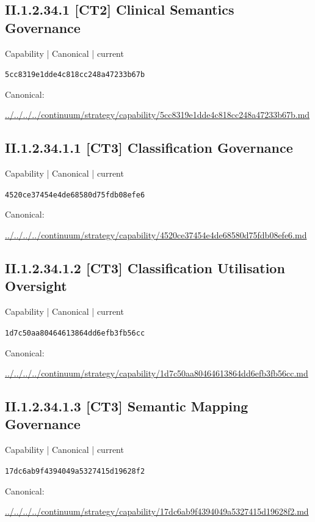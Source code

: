 \documentclass[10pt,a4paper]{article}
\begin{document}
\subsection*{II.1.2.34.1 [CT2] Clinical Semantics Governance}
{\small Capability | Canonical | current}\par
\texttt{5cc8319e1dde4c818cc248a47233b67b}\par
Canonical: \par
{\footnotesize\url{../../../../continuum/strategy/capability/5cc8319e1dde4c818cc248a47233b67b.md}}\par
\subsection*{II.1.2.34.1.1 [CT3] Classification Governance}
{\small Capability | Canonical | current}\par
\texttt{4520ce37454e4de68580d75fdb08efe6}\par
Canonical: \par
{\footnotesize\url{../../../../continuum/strategy/capability/4520ce37454e4de68580d75fdb08efe6.md}}\par
\subsection*{II.1.2.34.1.2 [CT3] Classification Utilisation Oversight}
{\small Capability | Canonical | current}\par
\texttt{1d7c50aa80464613864dd6efb3fb56cc}\par
Canonical: \par
{\footnotesize\url{../../../../continuum/strategy/capability/1d7c50aa80464613864dd6efb3fb56cc.md}}\par
\subsection*{II.1.2.34.1.3 [CT3] Semantic Mapping Governance}
{\small Capability | Canonical | current}\par
\texttt{17dc6ab9f4394049a5327415d19628f2}\par
Canonical: \par
{\footnotesize\url{../../../../continuum/strategy/capability/17dc6ab9f4394049a5327415d19628f2.md}}\par
\end{document}
